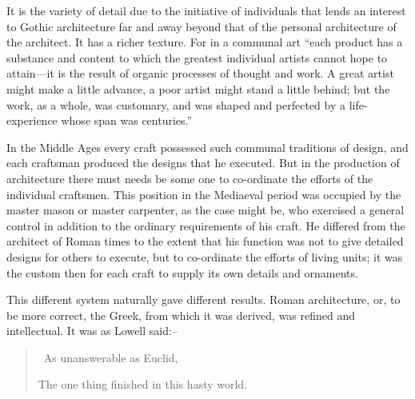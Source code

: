 \documentclass{book}
\begin{document}
It is the variety of detail due to the initiative of individuals that lends an interest to Gothic architecture far and away beyond that of the personal architecture of the architect. It has a richer texture. For in a communal art “each product has a substance and content to which the greatest individual artists cannot hope to attain—it is the result of organic processes of thought and work. A great artist might make a little advance, a poor artist might stand a little behind; but the work, as a whole, was customary, and was shaped and perfected by a life-experience whose span was centuries.”\footnotemark[1]

In the Middle Ages every craft possessed such communal traditions of design, and each craftsman produced the designs that he executed. But in the production of architecture there must needs be some one to co-ordinate the efforts of the individual craftsmen. This position in the Mediaeval period was occupied by the master mason or master carpenter, as the case might be, who exercised a general control in addition to the ordinary requirements of his craft. He differed from the architect of Roman times to the extent that his function was not to give detailed designs for others to execute, but to co-ordinate the efforts of living units; it was the custom then for each craft to supply its own details and ornaments.

This different system naturally gave different results. Roman architecture, or, to be more correct, the Greek, from which it was derived, was refined and intellectual. It was as Lowell said:–

\begin{quotation}\
	As unanswerable as Euclid,

	The one thing finished in this hasty world.
\end{quotation}
\end{document}
